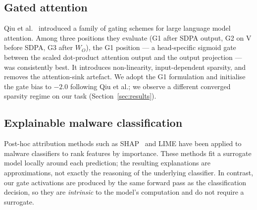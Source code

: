 \subsection{Gated attention}

Qiu et al.~\cite{qiu2025gated} introduced a family of gating schemes
for large language model attention. Among three positions they
evaluate (G1 after SDPA output, G2 on V before SDPA, G3 after $W_O$),
the G1 position — a head-specific sigmoid gate between the scaled
dot-product attention output and the output projection — was
consistently best. It introduces non-linearity, input-dependent
sparsity, and removes the attention-sink artefact.
We adopt the G1 formulation and initialise the gate bias to
$-2.0$ following Qiu et al.; we observe a different converged
sparsity regime on our task (Section~\ref{sec:results}).

\subsection{Explainable malware classification}

Post-hoc attribution methods such as SHAP~\cite{lundberg2017shap} and
LIME have been applied to malware classifiers to rank features by
importance. These methods fit a surrogate model locally around each
prediction; the resulting explanations are approximations, not
exactly the reasoning of the underlying classifier. In contrast, our
gate activations are produced by the same forward pass as the
classification decision, so they are \emph{intrinsic} to the model's
computation and do not require a surrogate.
